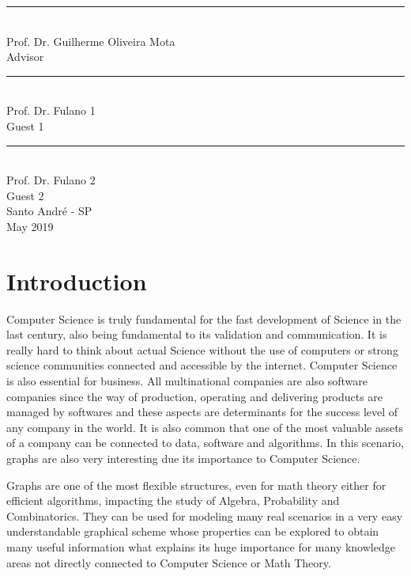 \documentclass[12pt,twoside,a4paper]{book}
\numberwithin{equation}{section}
\theoremstyle{remark}
\begin{document}
    \vspace{2.5 cm}
    \begin{center}
    \rule{10.0 cm}{0.02 cm}\\
    Prof. Dr. Guilherme Oliveira Mota\\
    Advisor\\
    
    \vspace{1.0 cm}
    \rule{10.0 cm}{0.02 cm}\\
    Prof. Dr. Fulano 1\\
    Guest 1\\
    
    \vspace{1.0 cm}
    \rule{10.0 cm}{0.02 cm}\\
    Prof. Dr. Fulano 2\\
    Guest 2\\
   
   \vfill
Santo André - SP\\
May 2019
\end{center}

\tableofcontents
\listoffigures

\chapter{Introduction}
Computer Science is truly fundamental for the fast development of Science in the last century, also being fundamental to its validation and communication. It is really hard to think about actual Science without the use of computers or strong science communities connected and accessible by the internet. Computer Science is also essential for business. All multinational companies are also software companies since the way of production, operating and delivering products are managed by softwares and these aspects are determinants for the success level of any company in the world. It is also common that one of the most valuable assets of a company can be connected to data, software and algorithms. In this scenario, graphs are also very interesting due its importance to Computer Science.

Graphs are one of the most flexible structures, even for math theory either for efficient algorithms, impacting the study of Algebra, Probability and Combinatorics. They can be used for modeling many real scenarios in a very easy understandable graphical scheme whose properties can be explored to obtain many useful information what explains its huge importance for many knowledge areas not directly connected to Computer Science or Math Theory.   
\end{document}
